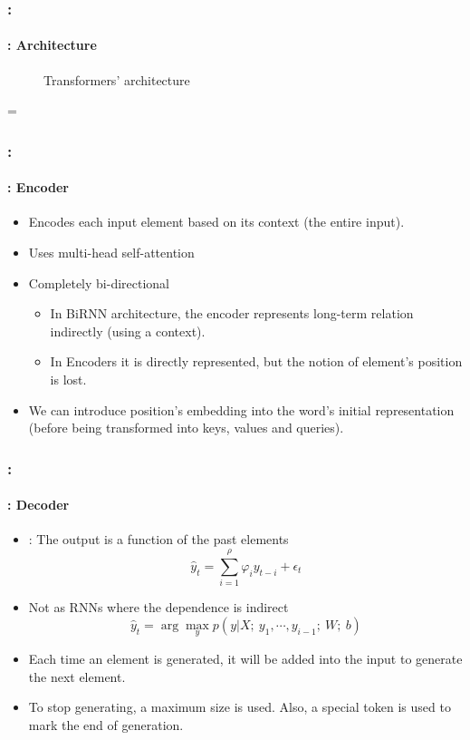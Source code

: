 \documentclass[xcolor=table]{beamer}
\begin{document}
\begin{frame}
	\frametitle{\insertshortsubtitle: \insertsection}
	\framesubtitle{\insertsubsection: Architecture}
	
	\begin{minipage}{0.49\textwidth}
		\begin{figure}
			\centering
			\vskip-8pt
			\caption{Transformers' architecture \cite{2017-vaswani-al}}
		\end{figure}
	\end{minipage}
	\begin{minipage}{0.1\textwidth}
		=
	\end{minipage}
	\begin{minipage}{0.39\textwidth}
	\end{minipage}
\end{frame}

\begin{frame}
	\frametitle{\insertshortsubtitle: \insertsection}
	\framesubtitle{\insertsubsection: Encoder}
	\begin{itemize}
		\item Encodes each input element based on its context (the entire input).
		\item Uses multi-head self-attention
		\item Completely bi-directional
		\begin{itemize}
			\item In BiRNN architecture, the encoder represents long-term relation indirectly (using a context).
			\item In Encoders it is directly represented, but the notion of element's position is lost.
		\end{itemize} 
		\item We can introduce position's embedding into the word's initial representation (before being transformed into keys, values and queries).
	\end{itemize}
\end{frame}

\begin{frame}
	\frametitle{\insertshortsubtitle: \insertsection}
	\framesubtitle{\insertsubsection: Decoder}
	\begin{itemize}
		\item {}: The output is a  function of the past elements
		\[\hat{y}_t = \sum_{i = 1}^{\rho} \varphi_{i} y_{t-i} + \epsilon_t\]
		\item Not as RNNs where the dependence is indirect
		\[\hat{y}_t = \arg\max_y p(y | X;\ y_1, \cdots, y_{i-1};\ W;\ b)\]
		\item Each time an element is generated, it will be added into the input to generate the next element.
		\item To stop generating, a maximum size is used. Also, a special token is used to mark the end of generation.
	\end{itemize}
\end{frame}
\end{document}
